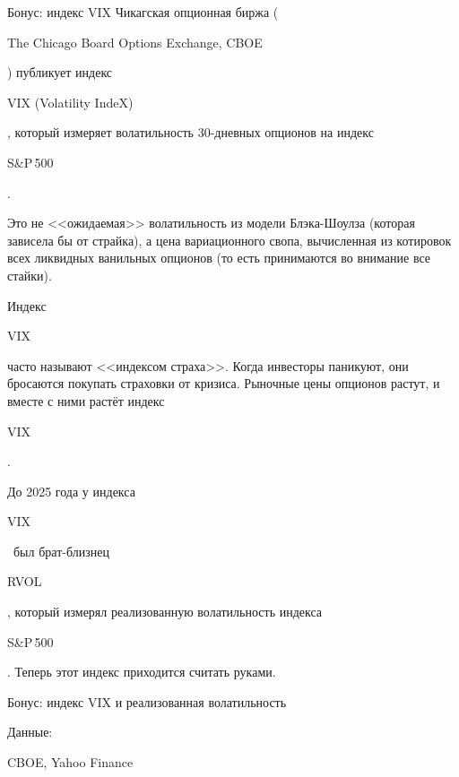 \documentclass{beamer}
\newcommand{\en}[1]{\begin{otherlanguage}{english}#1\end{otherlanguage}}
\begin{document}
\begin{frame}{Бонус: индекс VIX}
\justify
Чикагская опционная биржа (\en{The Chicago Board Options Exchange, CBOE}) публикует индекс \en{VIX (Volatility IndeX)}, который измеряет волатильность 30-дневных опционов на индекс \en{S\&P\,500}.

\justify
Это не <<ожидаемая>> волатильность из модели Блэка-Шоулза (которая зависела бы от страйка), а цена вариационного свопа, вычисленная из котировок всех ликвидных ванильных опционов (то есть принимаются во внимание все стайки).

\justify
Индекс \en{VIX} часто называют <<индексом страха>>. Когда инвесторы паникуют, они бросаются покупать страховки от кризиса. Рыночные цены опционов растут, и вместе с ними растёт индекс \en{VIX}.

\justify
До 2025 года у индекса \en{VIX}\ был брат-близнец \en{RVOL}, который измерял реализованную волатильность индекса \en{S\&P\,500}. Теперь этот индекс приходится считать руками.
\end{frame}



\begin{frame}{Бонус: индекс VIX и реализованная волатильность}
\centering
{}
\small Данные: \en{CBOE, Yahoo Finance}
\end{frame}
\end{document}
